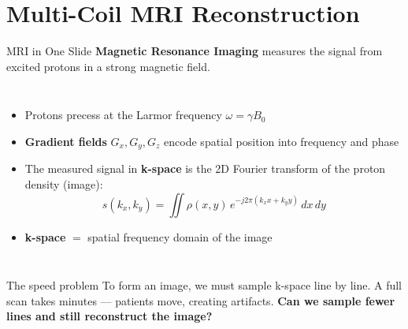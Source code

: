 \documentclass[aspectratio=169]{beamer}
\begin{document}
\section{Multi-Coil MRI Reconstruction}

\begin{frame}{MRI in One Slide}
    \textbf{Magnetic Resonance Imaging} measures the signal from excited protons
    in a strong magnetic field.

    \vspace{0.15cm}
    \begin{columns}[T]
        \begin{itemize}
            \item Protons precess at the Larmor frequency $\omega = \gamma B_0$
            \item \textbf{Gradient fields} $G_x, G_y, G_z$ encode spatial position
                  into frequency and phase
            \item The measured signal in \textbf{k-space} is the 2D Fourier transform
                  of the proton density (image):
                  \[
                      s(k_x, k_y) = \iint \rho(x, y)\, e^{-j2\pi(k_x x + k_y y)} \,dx\,dy
                  \]
            \item \textbf{k-space} $=$ spatial frequency domain of the image
        \end{itemize}

        \centering
    \end{columns}

    \vspace{0.15cm}
    \pause
    \begin{alertblock}{The speed problem}
        To form an image, we must sample k-space line by line.
        A full scan takes minutes --- patients move, creating artifacts.
        \textbf{Can we sample fewer lines and still reconstruct the image?}
    \end{alertblock}
\end{frame}
\end{document}
